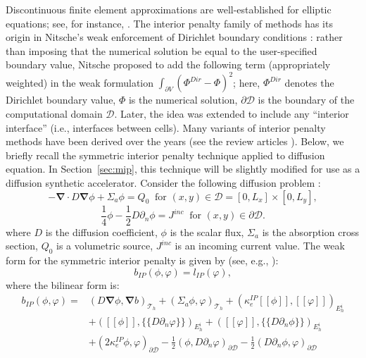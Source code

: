 \documentclass{mc2013}
\newcommand\bn{\boldsymbol{\nabla}}
\newcommand{\jmp}[1]{[\![#1]\!]}                     %
\newcommand{\mvl}[1]{\{\!\!\{#1\}\!\!\}}             %
\newcommand\tf{\varphi}
\newcommand\mc{\mathcal}
\renewcommand{\(}{\left(}
\renewcommand{\)}{\right)}
\renewcommand{\[}{\left[}
\renewcommand{\]}{\right]}
\begin{document}
Discontinuous finite element approximations are well-established for elliptic equations; see, for
instance, \cite{}. The interior penalty family of methods has its origin in Nitsche's weak enforcement
of Dirichlet boundary conditions \cite{nitsche}: rather than imposing that the numerical solution be equal to the
user-specified boundary value, Nitsche proposed to add the following term (appropriately weighted) 
in the weak formulation $\int_{\partial V} (\Phi^{Dir}-\Phi)^2$; 
here, $\Phi^{Dir}$ denotes the Dirichlet boundary value, $\Phi$ is the numerical 
solution, $\partial \mc{D}$ is the boundary of the computational domain $\mc{D}$. Later, the idea was extended to
include any ``interior interface'' (i.e., interfaces between cells). Many variants of interior penalty methods have
been derived over the years (see the review articles \cite{Kanschat2007,ip-review}). Below, we briefly
recall the symmetric interior penalty technique applied to diffusion equation. In Section~\ref{sec:mip},
this technique will be slightly modified for use as a diffusion synthetic accelerator.
%
%
Consider the following diffusion problem :
\begin{equation}
  -\bn \cdot D \bn \phi + \Sigma_a \phi = Q_0\ \textrm{ for } (x,y) \in \mc{D}=[0,L_x]\times[0,L_y],
\end{equation}
\begin{equation}
\frac{1}{4}\phi - \frac{1}{2} D \partial_n \phi =J^{inc}\ \textrm{ for } (x,y) \in \partial \mc{D}.
\end{equation}
%
where $D$ is the diffusion coefficient, $\phi$ is the scalar flux, $\Sigma_a$
is the absorption cross section, $Q_0$ is a volumetric source, $J^{inc}$ is an
incoming current value. The weak form for the symmetric interior penalty is given by (see, e.g., \cite{Kanschat2007}):
\begin{equation}
\label{eq:ip-form}
  b_{IP}(\phi,\tf) = l_{IP}(\tf),
\end{equation}
where the bilinear form is:
\begin{equation}
\label{eq:matrix-ip-form}
  \begin{split}
    b_{IP} (\phi,\tf) =& \(D\bn\phi,\bn b\)_{\mc{T}_h} + \(\Sigma_a \phi,\tf\)_{\mc{T}_h}  +
    (\kappa_e^{IP}\jmp{\phi},\jmp{\tf})_{E_h^i}\\
    &+ \( \jmp{\phi}, \mvl{D\partial_n \tf}\)_{E_h^i}
     + \( \jmp{\tf}, \mvl{D\partial_n \phi}\)_{E_h^i} \\
    &+ \(2\kappa_e^{IP} \phi, \tf \)_{\partial \mc{D}}
    -\frac{1}{2}\(\phi,D\partial_n \tf\)_{\partial \mc{D}}
    -\frac{1}{2}\(D\partial_n\phi,\tf\)_{\partial \mc{D}}
  \end{split}
\end{equation}
\end{document}
